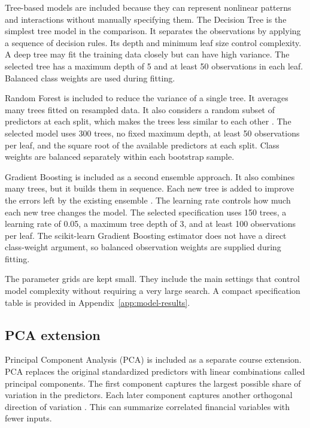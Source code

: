 \documentclass[11pt,a4paper]{article}
\begin{document}
Tree-based models are included because they can represent nonlinear patterns and
interactions without manually specifying them. The Decision Tree is the simplest
tree model in the comparison. It separates the observations by applying a
sequence of decision rules. Its depth and minimum leaf size control complexity. A deep tree
may fit the training data closely but can have high variance. The selected tree
has a maximum depth of 5 and at least 50 observations in each leaf. Balanced
class weights are used during fitting.

Random Forest is included to reduce the variance of a single tree. It averages
many trees fitted on resampled data. It also considers a random subset of
predictors at each split, which makes the trees less similar to each other
\citep{breiman2001}. The selected model uses 300 trees, no fixed maximum depth,
at least 50 observations per leaf, and the square root of the available
predictors at each split. Class weights are balanced separately within each
bootstrap sample.

Gradient Boosting is included as a second ensemble approach. It also combines
many trees, but it builds them in sequence. Each new tree is added to improve
the errors left by the existing ensemble \citep{friedman2001}. The learning
rate controls how much each new tree changes the model. The selected
specification uses 150 trees, a learning rate of 0.05, a maximum tree depth of
3, and at least 100 observations per leaf. The scikit-learn Gradient Boosting
estimator does not have a direct class-weight argument, so balanced observation
weights are supplied during fitting.

The parameter grids are kept small. They include the main settings that control
model complexity without requiring a very large search. A compact specification
table is provided in Appendix~\ref{app:model-results}.

\subsection{PCA extension}

Principal Component Analysis (PCA) is included as a separate course extension.
PCA replaces the original standardized predictors with linear combinations
called principal components. The first component captures the largest possible
share of variation in the predictors. Each later component captures another
orthogonal direction of variation \citep{jolliffe2016}. This can summarize
correlated financial variables with fewer inputs.
\end{document}
